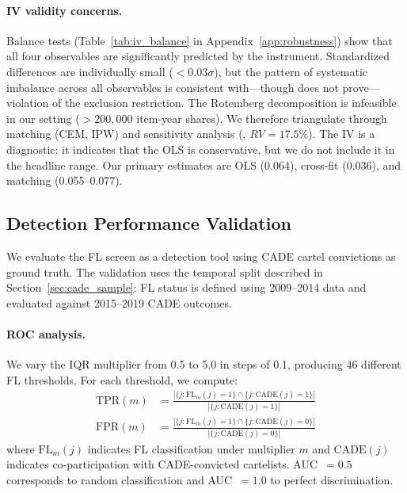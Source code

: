 \paragraph{IV validity concerns.}
Balance tests (Table~\ref{tab:iv_balance} in Appendix~\ref{app:robustness}) show that all four observables are significantly predicted by the instrument. Standardized differences are individually small ($< 0.03\sigma$), but the pattern of systematic imbalance across all observables is consistent with---though does not prove---violation of the exclusion restriction. The \citet{goldsmithpinkham2020bartik} Rotemberg decomposition is infeasible in our setting ($> 200{,}000$ item-year shares). We therefore triangulate through matching (CEM, IPW) and sensitivity analysis (\citealt{cinelli2020making}, $RV = 17.5\%$). The IV is a diagnostic: it indicates that the OLS is conservative, but we do not include it in the headline range. Our primary estimates are OLS (0.064), cross-fit (0.036), and matching (0.055--0.077).


\subsection{Detection Performance Validation}
\label{sec:detection_validation}

We evaluate the FL screen as a detection tool using CADE cartel
convictions as ground truth. The validation uses the temporal split
described in Section~\ref{sec:cade_sample}: FL status is defined using
2009--2014 data and evaluated against 2015--2019 CADE outcomes.

\paragraph{ROC analysis.}
We vary the IQR multiplier from 0.5 to 5.0 in steps of 0.1, producing
46 different FL thresholds. For each threshold, we compute:
\begin{align}
  \text{TPR}(m) &= \frac{|\{j : \text{FL}_m(j)=1\} \cap
    \{j : \text{CADE}(j)=1\}|}{|\{j : \text{CADE}(j)=1\}|}
  \label{eq:tpr} \\
  \text{FPR}(m) &= \frac{|\{j : \text{FL}_m(j)=1\} \cap
    \{j : \text{CADE}(j)=0\}|}{|\{j : \text{CADE}(j)=0\}|}
  \label{eq:fpr}
\end{align}
where $\text{FL}_m(j)$ indicates FL classification under multiplier $m$
and $\text{CADE}(j)$ indicates co-participation with CADE-convicted
cartelists. AUC~$= 0.5$ corresponds to random classification and
AUC~$= 1.0$ to perfect discrimination.

